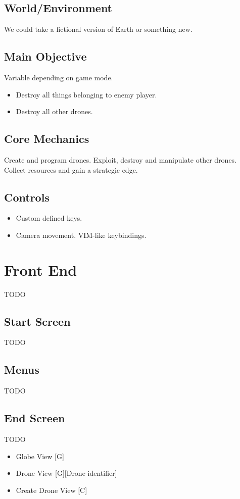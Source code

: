 \documentclass[a4paper]{scrreprt}
\begin{document}
\section{World/Environment}
We could take a fictional version of Earth or something new. 

\section{Main Objective}
Variable depending on game mode.
\begin{itemize}
    \item Destroy all things belonging to enemy player.
    \item Destroy all other drones. 
\end{itemize}


\section{Core Mechanics}
Create and program drones. Exploit, destroy and manipulate other drones. Collect resources and gain a strategic edge.

\section{Controls}
\begin{itemize}
    \item Custom defined keys.
    \item Camera movement. VIM-like keybindings. 
\end{itemize}


\chapter{Front End}
TODO

\section{Start Screen}
TODO

\section{Menus}
TODO

\section{End Screen}
TODO

\begin{itemize}
    \item Globe View [G]
    \item Drone View [G][Drone identifier]
    \item Create Drone View [C]
\end{itemize}
\end{document}
